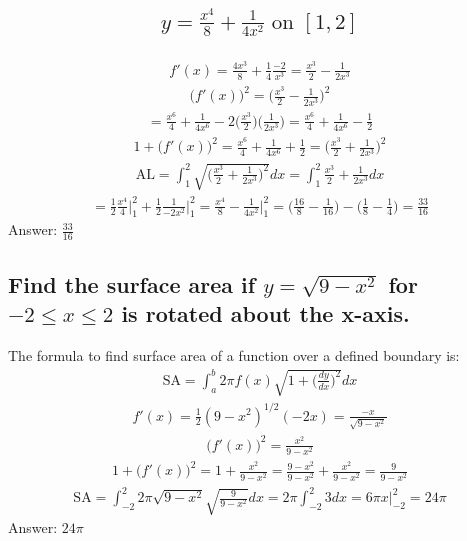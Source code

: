 \documentclass{article}
\begin{document}
\subsection{
	\begin{align*}
		y = \frac{x^4}{8} + \frac{1}{4x^2} \text{ on } [1, 2]
	\end{align*}
}
\begin{align*}
	f'(x) = \frac{4x^3}{8} + \frac{1}{4} \frac{-2}{x^3} = \frac{x^3}{2} - \frac{1}{2x^3}
\end{align*}
\begin{align*}
	\bigg( f'(x) \bigg)^2 = \bigg( \frac{x^3}{2} - \frac{1}{2x^3} \bigg)^2
\end{align*}
\begin{align*}
	= \frac{x^6}{4} + \frac{1}{4x^6} - 2 \bigg( \frac{x^3}{2} \bigg) \bigg( \frac{1}{2x^3} \bigg) = \frac{x^6}{4} + \frac{1}{4x^6} - \frac{1}{2}
\end{align*}
\begin{align*}
	1 + \bigg( f'(x) \bigg)^2 = \frac{x^6}{4} + \frac{1}{4x^6} + \frac{1}{2} = \bigg( \frac{x^3}{2} + \frac{1}{2x^3} \bigg)^2
\end{align*}
\begin{align*}
	\text{AL} = \int_1^2{\sqrt{\bigg( \frac{x^3}{2} + \frac{1}{2x^3} \bigg)^2}dx} = \int_1^2{\frac{x^3}{2} + \frac{1}{2x^3} dx}
\end{align*}
\begin{align*}
	= \frac{1}{2} \frac{x^4}{4} \bigg|_1^2 + \frac{1}{2} \frac{1}{-2x^2} \bigg|_1^2 = \frac{x^4}{8} - \frac{1}{4x^2} \bigg|_1^2 = \bigg( \frac{16}{8} - \frac{1}{16} \bigg) - \bigg( \frac{1}{8} - \frac{1}{4} \bigg) = \frac{33}{16}
\end{align*}
Answer: $\frac{33}{16}$

\subsection{Find the surface area if $y = \sqrt{9 - x^2}$ for $-2 \leq x \leq 2$ is rotated about the x-axis.}
The formula to find surface area of a function over a defined boundary is:
\begin{align*}
	\text{SA} = \int_a^b {2\pi f(x) \sqrt{1 + \bigg( \frac{dy}{dx} \bigg)^2}dx}
\end{align*}
\begin{align*}
	f'(x) = \frac{1}{2} (9 - x^2)^{1/2} (-2x) = \frac{-x}{\sqrt{9 - x^2}}
\end{align*}
\begin{align*}
	\bigg( f'(x) \bigg)^2 = \frac{x^2}{9 - x^2}
\end{align*}
\begin{align*}
	1 + \bigg( f'(x) \bigg)^2 = 1 + \frac{x^2}{9 - x^2} = \frac{9 - x^2}{9 - x^2} + \frac{x^2}{9 - x^2} = \frac{9}{9 - x^2}
\end{align*}
\begin{align*}
	\text{SA} = \int_{-2}^2{2\pi \sqrt{9 - x^2} \sqrt{\frac{9}{9 - x^2}}dx} = 2\pi \int_{-2}^2 {3dx} = 6\pi x \bigg|_{-2}^2 = 24\pi
\end{align*}
Answer: $24\pi$
\end{document}
